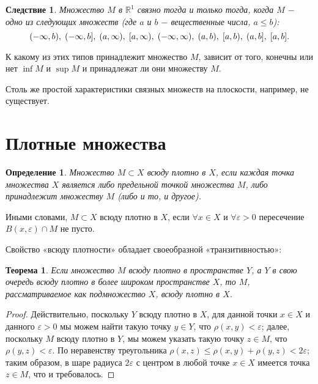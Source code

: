 \documentclass{article}
\newtheorem{theorem}{Теорема}[section]
\newtheorem{definition}{Определение}[section]
\newtheorem*{consequence}{Следствие}
\begin{document}
\begin{consequence}
Множество \(M\) в \(\mathbb{R}^1\) связно тогда и только тогда, когда \(M\) \(-\) одно из следующих множеств (где \(a\) и \(b\) \(-\) вещественные числа, \(a \leq b\)):
\[
(-\infty, b), \hspace{1mm} (-\infty, b], \hspace{1mm} (a, \infty), \hspace{1mm} [a, \infty), \hspace{1mm} (-\infty, \infty), \hspace{1mm} (a, b), \hspace{1mm} [a, b), \hspace{1mm} (a, b], \hspace{1mm} [a, b].
\]
\end{consequence}

К какому из этих типов принадлежит множество \(M\), зависит от того, конечны или нет \(\inf M\) и \(\sup M\) и принадлежат ли они множеству \(M\).

Столь же простой характеристики связных множеств на плоскости, например, не существует.

\section{Плотные множества}

\begin{definition}
Множество \(M \subset X\) всюду плотно в \(X\), если каждая точка множества \(X\) является либо предельной точкой множества \(M\), либо принадлежит множеству \(M\) (либо и то, и другое).
\end{definition}

Иными словами, \(M \subset X\) всюду плотно в \(X\), если \(\forall x \in X\) и \(\forall \varepsilon > 0\) пересечение \(B(x, \varepsilon) \cap M\) не пусто.

Свойство «всюду плотности» обладает своеобразной «транзитивностью»:

\begin{theorem}
Если множество \(M\) всюду плотно в пространстве \(Y\), а \(Y\) в свою очередь всюду плотно в более широком пространстве \(X\), то \(M\), рассматриваемое как подмножество \(X\), всюду плотно в \(X\).
\end{theorem}

\begin{proof}
Действительно, поскольку \(Y\) всюду плотно в \(X\), для данной точки \(x \in X\) и данного \(\varepsilon > 0\) мы можем найти такую точку \(y \in Y\), что \(\rho(x, y) < \varepsilon\); далее, поскольку \(M\) всюду плотно в \(Y\), мы можем указать такую точку \(z \in M\), что \(\rho(y, z) < \varepsilon\). По неравенству треугольника \(\rho(x, z) \leq \rho(x, y) + \rho(y, z) < 2\varepsilon\); таким образом, в шаре радиуса \(2\varepsilon\) с центром в любой точке \(x \in X\) имеется точка \(z \in M\), что и требовалось.
\end{proof}
\end{document}
